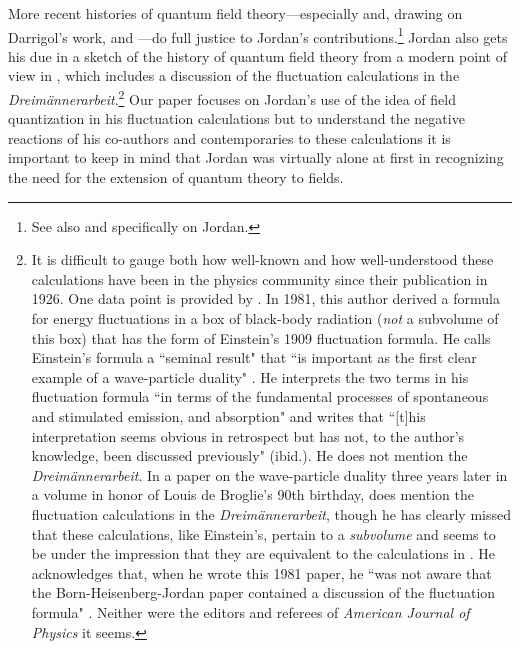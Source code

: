 \documentclass{elsart}
\begin{document}
More recent histories of quantum field theory---especially \citep{Darrigol 1986} and, drawing on Darrigol's work, \citep{Miller 1994} and \citep{Schweber 1994}---do full justice to Jordan's contributions.\footnote{See also \citep{Ehlers 2007} and \citep{Schroer 2007} specifically on Jordan.} Jordan also gets his due in a sketch of the history of quantum field theory from a modern point of view in \citep[sec.\ 1.2, pp.\ 15--31]{Weinberg 1995}, which includes a discussion of the fluctuation calculations in the {\it Dreim\"annerarbeit}.\footnote{\label{milonni}It is difficult to gauge both how well-known and how well-understood these calculations have been in the physics community since their publication in 1926. One data point is provided by \citep{Milonni 1981, Milonni 1984}. In 1981, this author derived a formula for energy fluctuations in a box of black-body radiation ({\it not} a subvolume of this box) that has the form of Einstein's 1909 fluctuation formula. He calls Einstein's formula a ``seminal result" that ``is important as the first clear example of a wave-particle duality" \citep[p.\ 177; the author cites \citep{Pais 1979} in this context (cf.\ note \ref{pais})]{Milonni 1981}.  He interprets the two terms in his fluctuation formula ``in terms of the fundamental processes of spontaneous and stimulated emission, and absorption" and writes that ``[t]his interpretation seems obvious in retrospect but has not, to the author's knowledge, been discussed previously" (ibid.). He does not mention the {\it Dreim\"annerarbeit}. In a paper on the wave-particle duality three years later in a volume in honor of Louis de Broglie's 90th birthday, \citet[pp.\ 39--41]{Milonni 1984} does mention the fluctuation calculations in the {\it Dreim\"annerarbeit}, though he has clearly missed that these calculations, like Einstein's, pertain to a {\it subvolume} and seems to be under the impression that they are equivalent to the calculations in \citep{Milonni 1981}. He acknowledges that, when he wrote this 1981 paper, he ``was not aware that the Born-Heisenberg-Jordan paper contained a discussion of the fluctuation formula" \citep[p. 62, note 27]{Milonni 1984}. Neither were the editors and referees of {\it American Journal of Physics} it seems.}  Our paper focuses on Jordan's use of the idea of field quantization in his fluctuation calculations but to understand the negative reactions of his co-authors and contemporaries to these calculations it is important to keep in mind that Jordan was virtually alone at first in recognizing the need for the extension of quantum theory to fields.
\end{document}
